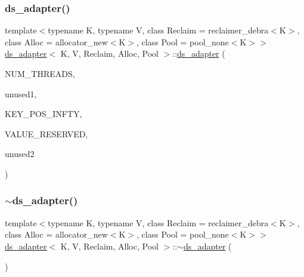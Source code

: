 \mbox{\label{classds__adapter_a748c3142996686795e2d64328f9310eb}} 
\subsubsection{\texorpdfstring{ds\+\_\+adapter()}{ds\_adapter()}\hspace{0.1cm}{\footnotesize\ttfamily [23/27]}}
{\footnotesize\ttfamily template$<$typename K, typename V, class Reclaim = reclaimer\+\_\+debra$<$\+K$>$, class Alloc = allocator\+\_\+new$<$\+K$>$, class Pool = pool\+\_\+none$<$\+K$>$$>$ \\
\hyperlink{classds__adapter}{ds\+\_\+adapter}$<$ K, V, Reclaim, Alloc, Pool $>$\+::\hyperlink{classds__adapter}{ds\+\_\+adapter} (\begin{DoxyParamCaption}\item[{const int}]{N\+U\+M\+\_\+\+T\+H\+R\+E\+A\+DS,  }\item[{const K \&}]{unused1,  }\item[{const K \&}]{K\+E\+Y\+\_\+\+P\+O\+S\+\_\+\+I\+N\+F\+TY,  }\item[{const V \&}]{V\+A\+L\+U\+E\+\_\+\+R\+E\+S\+E\+R\+V\+ED,  }\item[{\hyperlink{classRandomFNV1A}{Random\+F\+N\+V1A} $\ast$const}]{unused2 }\end{DoxyParamCaption})\hspace{0.3cm}{\ttfamily [inline]}}

\mbox{\label{classds__adapter_a366f46dd39d59f2d4a147589f5fd98e3}} 
\subsubsection{\texorpdfstring{$\sim$ds\+\_\+adapter()}{~ds\_adapter()}\hspace{0.1cm}{\footnotesize\ttfamily [22/26]}}
{\footnotesize\ttfamily template$<$typename K, typename V, class Reclaim = reclaimer\+\_\+debra$<$\+K$>$, class Alloc = allocator\+\_\+new$<$\+K$>$, class Pool = pool\+\_\+none$<$\+K$>$$>$ \\
\hyperlink{classds__adapter}{ds\+\_\+adapter}$<$ K, V, Reclaim, Alloc, Pool $>$\+::$\sim$\hyperlink{classds__adapter}{ds\+\_\+adapter} (\begin{DoxyParamCaption}{ }\end{DoxyParamCaption})\hspace{0.3cm}{\ttfamily [inline]}}

